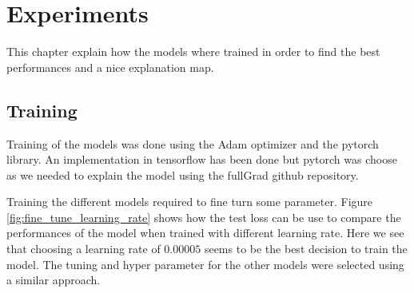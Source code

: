 \chapter{Experiments}
This chapter explain how the models where trained in order to find the best performances and a nice explanation map.
\section{Training}
Training of the models was done using the Adam\cite{kingma2014adam} optimizer and the pytorch\cite{pytorch_paszke2017automatic} library. An implementation in tensorflow\cite{tensorflow_45166} has been done but pytorch was choose as we needed to explain the model using the fullGrad\cite{fullgradient} github repository.

Training the different models required to fine turn some parameter. Figure \ref{fig:fine_tune_learning_rate} shows how the test loss can be use to compare the performances of the model when trained with different learning rate. Here we see that choosing a learning rate of $0.00005$ seems to be the best decision to train the model. The tuning and hyper parameter for the other models were selected using a similar approach.  

